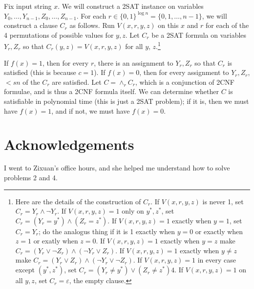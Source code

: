 \documentclass{article}
\def \eps {{\varepsilon}}
\begin{document}
Fix input string $x$.
We will construct a 2SAT instance on variables $Y_0, \dots, Y_{n-1}, Z_0, \dots, Z_{n-1}$.
For each $r \in \{0, 1\}^{\log n} = \{0, 1, \dots, n-1\}$, we will construct a clause
$C_r$ as follows.
Run $V(x, r, y, z)$ on this $x$ and $r$ for each of the 4 permutations of possible
values for $y, z$.
Let $C_r$ be a 2SAT formula on variables $Y_r, Z_r$ so that $C_r(y, z) = V(x, r, y, z)$ for all $y$, $z$.\footnote{
Here are the details of the construction of $C_r$.
If $V(x, r, y, z)$ is never 1, set $C_r = Y_r \wedge \neg Y_r$.
If $V(x, r, y, z) = 1$ only on $y^*, z^*$, set $C_r = (Y_r = y^*) \wedge (Z_r = z^*)$.
If $V(x, r, y, z) = 1$ exactly when $y = 1$, set $C_r = Y_r$; do the analogus thing if it is 1 exactly when $y = 0$ or exactly when $z = 1$ or exatly when $z = 0$.
If $V(x, r, y, z) = 1$ exactly when $y = z$ make $C_r = (Y_r \vee \neg Z_r) \wedge (\neg Y_r \vee Z_r)$.
If $V(x, r, y, z) = 1$ exactly when $y \neq z$ make $C_r = (Y_r \vee Z_r) \wedge (\neg Y_r \vee \neg Z_r)$.
If $V(x, r, y, z) = 1$ in every case except $(y^*, z^*)$, set $C_r = (Y_r \neq y^*) \vee (Z_r \neq z^*)4$.
If $V(x, r, y, z) = 1$ on all $y, z$, set $C_r = \eps$, the empty clause.
}

If $f(x) = 1$, then for every $r$, there is an assignment to $Y_r, Z_r$ so that $C_r$ is satisfied (this is because $c = 1$).
If $f(x) = 0$, then for every assignment to $Y_r, Z_r$,
$< sn$ of the $C_r$ are satisfied.
Let $C = \wedge_{r} C_r$, which is a conjunction of 2CNF formulae, and is thus a 2CNF formula itself.
We can determine whether $C$ is satisfiable in polynomial time (this is just a 2SAT problem); if it is, then we must have $f(x) = 1$, and if not, we must have $f(x) = 0$.

\newpage
\section*{Acknowledgements}
I went to Zixuan's office hours, and she helped me understand how to solve problems 2 and 4.
\end{document}
